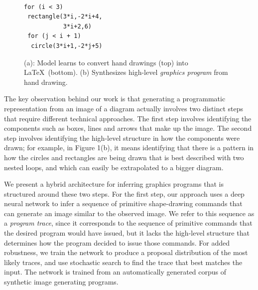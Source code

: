 \documentclass{article}
\begin{document}
\begin{figure}[h]
\begin{minipage}[t]{0.7\linewidth}
\begin{tabular}{llll}
\end{tabular}
\subcaption{}
  \end{minipage}%
  \begin{minipage}[t]{0.3\linewidth}
    \\
    \begin{minipage}[t]{0.3\linewidth}
\begin{Verbatim}
for (i < 3)
 rectangle(3*i,-2*i+4,
           3*i+2,6)
 for (j < i + 1)
  circle(3*i+1,-2*j+5)
\end{Verbatim}      
      \end{minipage}
    \subcaption{}
  \end{minipage}
  \caption{(a): Model learns to convert hand drawings (top) into \LaTeX~(bottom). (b) Synthesizes high-level \emph{graphics program} from hand drawing.}\label{firstPageExamples}
\end{figure}

The key observation behind our work is that generating a programmatic representation from an image of a diagram actually involves two distinct steps that require different technical approaches. The first step involves identifying the components such as boxes, lines and arrows that make up the image. The second step involves identifying the high-level structure in how the components were drawn; for example, in Figure 1(b), it means identifying that there is a pattern in how the circles and rectangles are being drawn that is best described with two nested loops, and which can easily be extrapolated to a bigger diagram. 

We present a hybrid architecture for inferring graphics programs that is structured around these two steps. For the first step, our approach uses a deep neural network to infer a sequence of primitive shape-drawing commands that can generate an image similar to the observed image. We refer to this sequence as a \emph{program trace}, since it corresponds to the sequence of primitive commands that the desired program would have issued, but it lacks the high-level structure that determines how the program decided to issue those commands. For added robustness, we train the network to produce a proposal distribution of the most likely traces, and use stochastic search to find the trace that best matches the input. The network is trained from an automatically generated corpus of synthetic image generating programs.
\end{document}
